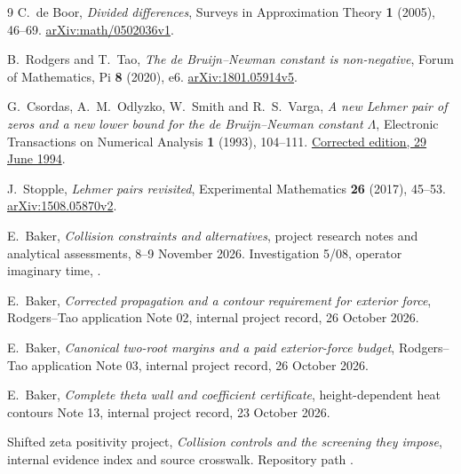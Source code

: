 \documentclass[11pt]{article}
\numberwithin{equation}{section}
\theoremstyle{remark}
\begin{document}
\clearpage
\begingroup\raggedright
\begin{thebibliography}{9}
C.~de Boor, \emph{Divided differences}, Surveys in Approximation
Theory \textbf{1} (2005), 46--69.
\href{https://arxiv.org/abs/math/0502036v1}{arXiv:math/0502036v1}.

B.~Rodgers and T.~Tao, \emph{The de Bruijn--Newman constant is
non-negative}, Forum of Mathematics, Pi \textbf{8} (2020), e6.
\href{https://arxiv.org/abs/1801.05914v5}{arXiv:1801.05914v5}.

G.~Csordas, A.~M.~Odlyzko, W.~Smith and R.~S.~Varga,
\emph{A new Lehmer pair of zeros and a new lower bound for the
de Bruijn--Newman constant \(\Lambda\)}, Electronic Transactions on
Numerical Analysis \textbf{1} (1993), 104--111.
\href{https://etna.ricam.oeaw.ac.at/vol.1.1993/pp104-111.dir/pp104-111.pdf}
{Corrected edition, 29 June 1994}.

J.~Stopple, \emph{Lehmer pairs revisited}, Experimental Mathematics
\textbf{26} (2017), 45--53.
\href{https://arxiv.org/abs/1508.05870v2}{arXiv:1508.05870v2}.

E.~Baker, \emph{Collision constraints and alternatives}, project research
notes and analytical assessments, 8--9 November 2026.
Investigation 5/08, operator imaginary time, .

E.~Baker, \emph{Corrected propagation and a contour requirement for
exterior force}, Rodgers--Tao application Note 02, internal project
record, 26 October 2026.

E.~Baker, \emph{Canonical two-root margins and a paid exterior-force
budget}, Rodgers--Tao application Note 03, internal project record,
26 October 2026.

E.~Baker, \emph{Complete theta wall and coefficient certificate},
height-dependent heat contours Note 13, internal project record,
23 October 2026.

Shifted zeta positivity project, \emph{Collision controls and the
screening they impose}, internal evidence index and source crosswalk.
Repository path .
\end{thebibliography}
\endgroup
\end{document}
